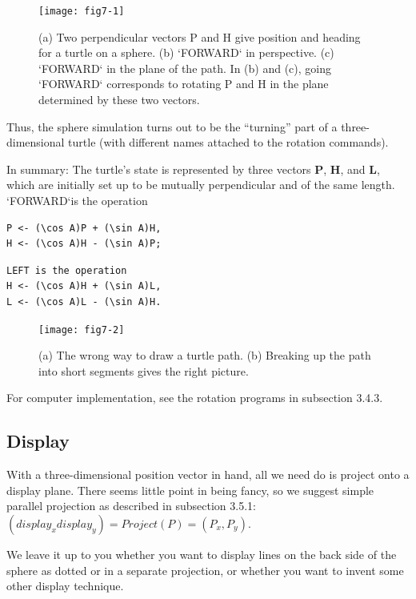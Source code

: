 \documentclass{book}
\begin{document}
\begin{figure}
\begin{center}
\texttt{[image: fig7-1]}
\caption{(a) Two perpendicular vectors P and H give position and heading for a turtle on a sphere. (b) \textsc{`FORWARD`} in perspective. (c) \textsc{`FORWARD`} in the plane of the path. In (b) and (c), going \textsc{`FORWARD`} corresponds to rotating P and H in the plane determined by these
two vectors.}
\end{center}
\end{figure}

Thus, the sphere simulation turns out to be the ``turning'' part of a
three-dimensional turtle (with different names attached to the rotation
commands).

In summary: The turtle's state is represented by three vectors \textbf{P}, \textbf{H},
and \textbf{L}, which are initially set up to be mutually perpendicular and of
the same length. \textsc{`FORWARD`}is the operation

\begin{verbatim}
P <- (\cos A)P + (\sin A)H,
H <- (\cos A)H - (\sin A)P;
\end{verbatim}
\begin{verbatim}
LEFT is the operation
H <- (\cos A)H + (\sin A)L,
L <- (\cos A)L - (\sin A)H.
\end{verbatim}
\begin{figure}
\begin{center}
\texttt{[image: fig7-2]}
\caption{(a) The wrong way to draw a turtle path. (b) Breaking up the path into short segments gives the right picture.}
\end{center}
\end{figure}

For computer implementation, see the rotation programs in subsection 3.4.3.

\subsection{Display}

With a three-dimensional position vector in hand, all we need do is
project onto a display plane. There seems little point in being fancy, so
we suggest simple parallel projection as described in subsection 3.5.1:
$(display_x display_y) = Project(P) = (P_x, P_y)$.

We leave it up to you whether you want to display lines on the back side
of the sphere as dotted or in a separate projection, or whether you want
to invent some other display technique.
\end{document}
